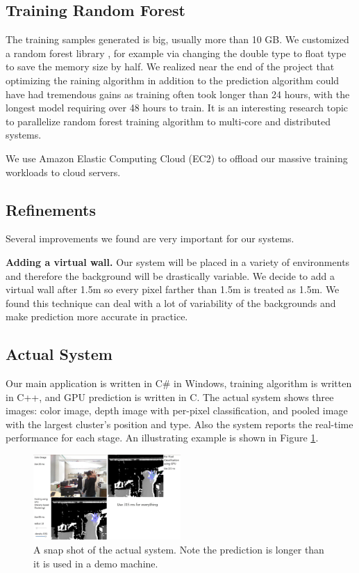 \cutsection
\subsection{Training Random Forest}
\cutsection

The training samples generated is big, usually more than 10 GB. We customized a random forest library \cite{alglib}, for example via changing the double type to float type to save the memory size by half. We realized near the end of the project that optimizing the raining algorithm in addition to the prediction algorithm could have had tremendous gains as training often took longer than 24 hours, with the longest model requiring over 48 hours to train. It is an interesting research topic to parallelize random forest training algorithm to multi-core and distributed systems.     

We use Amazon Elastic Computing Cloud (EC2) to offload our massive training workloads to cloud servers.  

\cutsection
\subsection{Refinements}
\cutsection
\label{sec:refinement}

Several improvements we found are very important for our systems.

\textbf{Adding a virtual wall.} Our system will be placed in a variety of environments and therefore the background will be drastically variable. We decide to add a virtual wall after 1.5m so every pixel farther than 1.5m is treated as 1.5m. We found this technique can deal with a lot of variability of the backgrounds and make prediction more accurate in practice. 

\cutsection
\subsection{Actual System}
\cutsection

Our main application is written in C\# in Windows, training algorithm is written in C++, and GPU prediction is written in C. The actual system shows three images: color image, depth image with per-pixel classification, and pooled image with the largest cluster's position and type. Also the system reports the real-time performance for each stage. An illustrating example is shown in Figure \ref{fig: system}.


\begin{figure}
\centering
	\includegraphics[width=0.5\textwidth]{fig/System.jpg}
	\caption{A snap shot of the actual system. Note the prediction is longer than it is used in a demo machine.}
\label{fig: system}
\end{figure}

